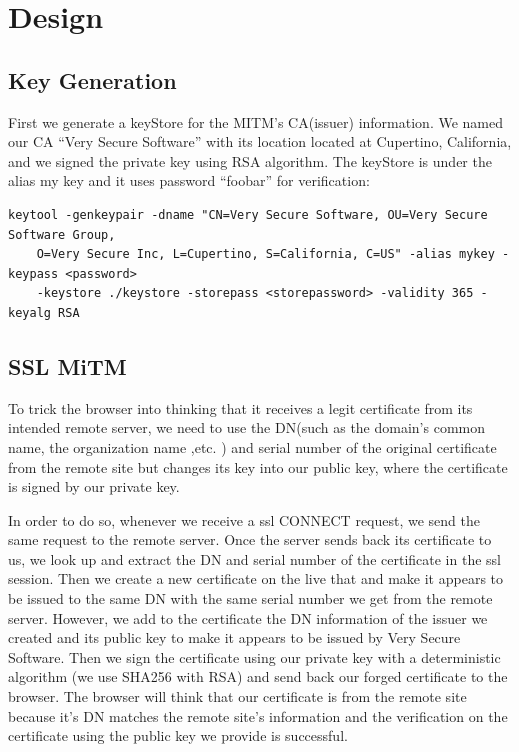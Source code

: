 \section{Design}

\subsection{Key Generation}

First we generate a keyStore for the MITM's CA(issuer) information. We named our CA ``Very Secure Software'' with its location located at Cupertino, California, and we signed the private key using RSA algorithm. The keyStore is under the alias my key and it uses password  ``foobar'' for verification:

\begin{lstlisting} 
keytool -genkeypair -dname "CN=Very Secure Software, OU=Very Secure Software Group, 
    O=Very Secure Inc, L=Cupertino, S=California, C=US" -alias mykey -keypass <password> 
    -keystore ./keystore -storepass <storepassword> -validity 365 -keyalg RSA
\end{lstlisting}

\subsection{SSL MiTM}

To trick the browser into thinking that it receives a legit certificate from its intended remote server, we need to use the DN(such as the domain's common name, the organization name ,etc. ) and serial number of the original certificate from the remote site but changes its key into our public key, where the certificate is signed by our private key. 

In order to do so, whenever we receive a ssl CONNECT request, we send the same request to the remote server.  Once the server sends back its certificate to us, we look up and extract the DN and serial number of the certificate in the ssl session. Then we create a new certificate on the live that and make it appears to be issued to the same DN with the same serial number we get from the remote server. However, we add to the certificate the DN information of the issuer we created and its public key to make it appears to be issued by Very Secure Software. Then we sign the certificate using our private key with a deterministic algorithm (we use SHA256 with RSA) and send back our forged certificate to the browser. The browser will think that our certificate is from the remote site because it's DN matches the remote site's information and the verification on the certificate using the public key we provide is successful. 

